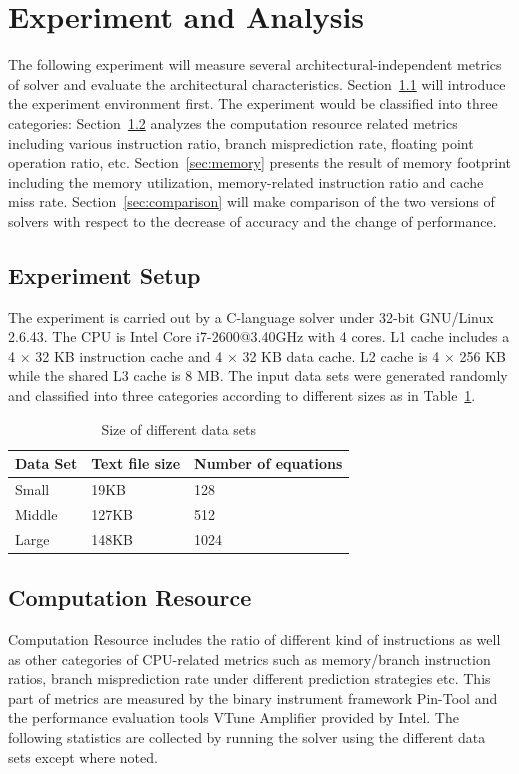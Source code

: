 \section{Experiment and Analysis}
\label{sec:experiment}
The following experiment will measure several architectural-independent metrics of \SA solver and evaluate the architectural characteristics. Section~\ref{sec:setup} will introduce the experiment environment first. The experiment would be classified into three categories: Section~\ref{sec:computation} analyzes the computation resource related metrics including various instruction ratio, branch misprediction rate, floating point operation ratio, etc. Section~\ref{sec:memory} presents the result of memory footprint including the memory utilization, memory-related instruction ratio and cache miss rate. Section~\ref{sec:comparison} will make comparison of the two versions of \SA solvers with respect to the decrease of accuracy and the change of performance.
\subsection{Experiment Setup}
\label{sec:setup}
The experiment is carried out by a C-language \SA solver under 32-bit GNU/Linux 2.6.43. The CPU is Intel Core i7-2600@3.40GHz with 4 cores. L1 cache includes a 4 $\times$ 32 KB instruction cache and 4 $\times$ 32 KB data cache. L2 cache is 4 $\times$ 256 KB while the shared L3 cache is 8 MB. The input data sets were generated randomly and classified into three categories according to different sizes as in Table~\ref{tab:sizes}.

\begin{table}
  \centering
  \begin{tabular}{|l|l|l|}\hline
  \textbf{Data Set} & \textbf{Text file size} & \textbf{Number of equations}\\\hline
  Small & 19KB & 128 \\\hline
  Middle&127KB&512\\\hline
  Large&148KB&1024\\\hline
  \end{tabular}
  \caption{Size of different data sets}\label{tab:sizes}
\end{table}

\subsection{Computation Resource}
\label{sec:computation}
Computation Resource includes the ratio of different kind of instructions as well as other categories of CPU-related metrics such as memory/branch instruction ratios, branch misprediction rate under different prediction strategies etc. This part of metrics are measured by the binary instrument framework Pin-Tool and the performance evaluation tools VTune Amplifier provided by Intel. The following statistics are collected by running the solver using the different data sets except where noted.
